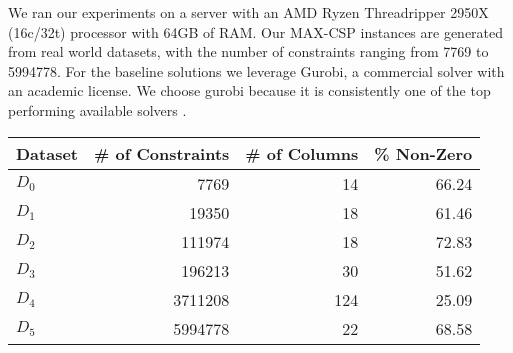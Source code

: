 \documentclass[a4paper]{article}
\begin{document}
We ran our experiments on a server with an AMD Ryzen Threadripper 2950X (16c/32t) processor with 
64GB of RAM. Our MAX-CSP instances are generated from real world datasets, with the number of constraints 
ranging from 7769 to 5994778. For the baseline solutions we 
leverage Gurobi, a commercial solver with an academic license. We choose gurobi because it is consistently 
one of the top performing available solvers \cite{benchmark}.

\begin{tabular}{|l|r|r|r|}
\toprule
Dataset &  \# of Constraints &  \# of Columns &  \% Non-Zero \\
\midrule
         $D_0$ &                   7769 &                 14 &         66.24 \\
         $D_1$ &                  19350 &                 18 &         61.46 \\
         $D_2$ &                 111974 &                 18 &         72.83 \\
         $D_3$ &                 196213 &                 30 &         51.62 \\
         $D_4$ &                3711208 &                124 &         25.09 \\
         $D_5$ &                5994778 &                 22 &         68.58 \\
\bottomrule
\end{tabular}




\end{document}
